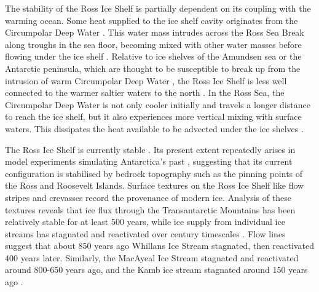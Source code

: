 The stability of the Ross Ice Shelf is partially dependent on its coupling with the warming ocean. Some heat supplied to the ice shelf cavity originates from the Circumpolar Deep Water \cite[e.g.][]{rignot2002mass}. This water mass intrudes across the Ross Sea Break along troughs in the sea floor, becoming mixed with other water masses before flowing under the ice shelf \citep{castagno2017temporal}. Relative to ice shelves of the Amundsen sea or the Antarctic peninsula, which are thought to be susceptible to break up from the intrusion of warm Circumpolar Deep Water \citep{ favier2014retreat}, the Ross Ice Shelf is less well connected to the warmer saltier waters to the north \citep{dinniman2011model}. In the Ross Sea, the Circumpolar Deep Water is not only cooler initially and travels a longer distance to reach the ice shelf, but it also experiences more vertical mixing with surface waters. This dissipates the heat available to be advected under the ice shelves \citep{dinniman2011model}.

The Ross Ice Shelf is currently stable \citep{paolo2015volume}.  Its present extent repeatedly arises in model experiments simulating Antarctica's past \citep{pollard2009modelling}, suggesting that its current configuration is stabilised by bedrock topography such as the pinning points of the Ross and Roosevelt Islands. Surface textures on the Ross Ice Shelf like flow stripes and crevasses record the provenance of modern ice. Analysis of these textures reveals that ice flux through the Transantarctic Mountains has been relatively stable for at least 500 years, while ice supply from individual ice streams has stagnated and reactivated over century timescales \citep{hulbe2007century}. Flow lines suggest that about 850 years ago Whillans Ice Stream stagnated, then reactivated 400 years later. Similarly, the MacAyeal Ice Stream stagnated and reactivated around 800-650 years ago, and the Kamb ice stream stagnated around 150 years ago \citep{hulbe2007century}.

